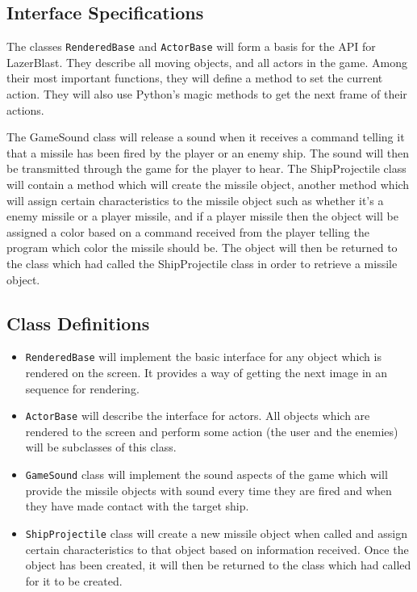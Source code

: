 %
\subsection*{Interface Specifications}
    The classes \texttt{RenderedBase} and
    \texttt{ActorBase} will form a basis for
    the API for LazerBlast.  They describe all moving
    objects, and all actors in the game.  Among their
    most important functions, they will define a method
    to set the current action.  They will also use Python's
    magic methods to get the next frame of their actions.

    The GameSound class will release a sound when it receives
    a command telling it that a missile has been fired by
    the player or an enemy ship.  The sound will then be transmitted
    through the game for the player to hear.  The ShipProjectile
    class will contain a method which will create the missile
    object, another method which will assign certain characteristics
    to the missile object such as whether it’s a enemy missile or a
    player missile, and if a player missile then the object will be
    assigned a color based on a command received from the player
    telling the program which color the missile should be. The
    object will then be returned to the class which had called the
    ShipProjectile class in order to retrieve a missile object.

\subsection*{Class Definitions}
    \begin{itemize}
        \item \texttt{RenderedBase} will implement the basic
        interface for any object which is rendered on the screen.
        It provides a way of getting the next image in an sequence
        for rendering.
        \item \texttt{ActorBase} will describe the interface
        for actors.  All objects which are rendered to the screen and
        perform some action (the user and the enemies) will be subclasses
        of this class.
        \item \texttt{GameSound} class will implement
        the sound aspects of the game which will provide the
        missile objects with sound every time they are fired and
        when they have made contact with the target
        ship.
        \item \texttt{ShipProjectile} class will create
        a new missile object when called and assign certain
        characteristics to that object based on information
        received. Once the object has been created, it will then
        be returned to the class which had called for it to be created.
    \end{itemize}

